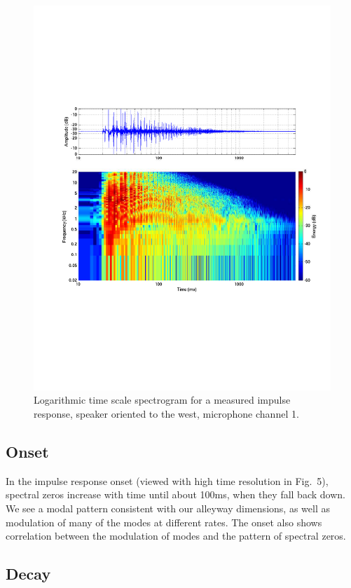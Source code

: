 \documentclass{aes137}
\begin{document}
\begin{figure}[h!] \centering \includegraphics[width=\linewidth]{images/P14IR_irsg_cropped.pdf} \caption{Logarithmic time scale spectrogram for a measured impulse response, speaker oriented to the west, microphone channel 1.} \end{figure}

\subsection{Onset}
In the impulse response onset (viewed with high time resolution in Fig.~5), spectral zeros increase with time until about 100ms, when they fall back down. We see a modal pattern consistent with our alleyway dimensions, as well as modulation of many of the modes at different rates. The onset also shows correlation between the modulation of modes and the pattern of spectral zeros.

\subsection{Decay}
\end{document}
